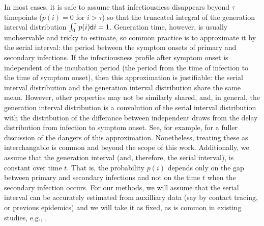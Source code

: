 In most cases, it is safe to assume that
infectiousness disappears beyond $\tau$ timepoints ($p(i) = 0$ for $i > \tau$)
so that the truncated integral of the generation interval distribution
$\int_0^\tau p(i)\mathsf{d} i = 1$.
Generation time, however, is usually unobservable and tricky to estimate, so
common practice is to approximate it by the serial interval: the period between
the symptom onsets of primary and secondary infections. If the infectiousness
profile after symptom onset is independent of the incubation period (the period
from the time of infection to the time of symptom onset), then this
approximation is justifiable: the serial interval distribution and the
generation interval distribution share the same mean. However, other properties
may not be similarly shared, and, in general, the generation interval
distribution is a convolution of the serial interval distribution with the
distribution of the differance between independent draws from the delay
distribution from infection to symptom onset. See, for example,
\citet{gostic2020practical} for a fuller discussion of the dangers of this
approximation. Nonetheless, treating these as interchangable is common
\citep{cori2013new} and beyond the scope of this work. Additionally, we assume
that the generation interval (and, therefore, the serial interval), is constant over time
$t$. That is, the probability $p(i)$ depends only on the gap between primary and
secondary infections and not on the time $t$ when the secondary infection
occurs. For our methods, we will assume that the serial interval can be
accurately estimated from auxilliary data (say by contact tracing, or previous
epidemics) and we will take it as fixed, as is common in existing studies, e.g.,
\cite{cori2013new,abry2020spatial,pascal2022nonsmooth}.

